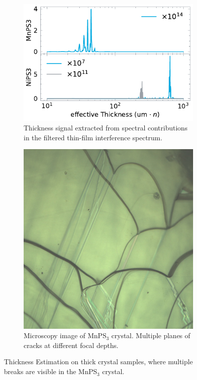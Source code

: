 \documentclass[
	twoside,
	parskip=half,
	a4paper,
]{scrbook}
\begin{document}
\begin{figure}
	\begin{subfigure}[t]{3.5in}
		\vskip 0pt
		\centering
		\includegraphics{../figures/2024-03-14 thickness.pdf}
		\caption{Thickness signal extracted from spectral contributions in the filtered thin-film interference spectrum.}
		\label{fig:thickness bulk}
	\end{subfigure}
	\begin{subfigure}[t]{.3\textwidth}
		\vskip 4pt
		\centering
		\includegraphics[width=\textwidth]{../../data/2023-11-02/i001_MnPS3_50x_a.png}
		\caption{Microscopy image of MnPS$_3$ crystal. Multiple planes of cracks at different focal depths.}
		\label{fig:thickness MnPS3}
	\end{subfigure}
	\caption{Thickness Estimation on thick crystal samples, where multiple breaks are visible in the MnPS$_3$ crystal.} 
\end{figure}
\end{document}

